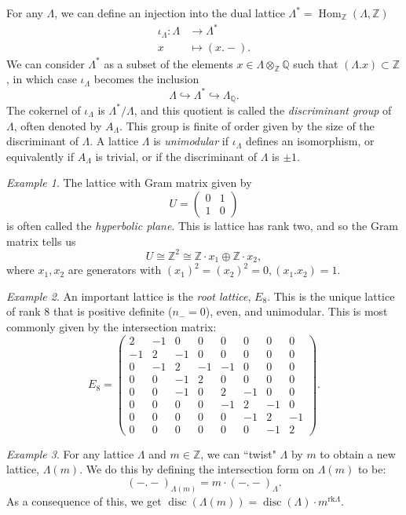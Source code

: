 \documentclass[12pt,twoside]{reedthesis}
\theoremstyle{plain}
\theoremstyle{definition}
\theoremstyle{remark}
\newtheorem{example}{Example}[section]
\newcommand{\ZZ}{\mathbb{Z}}
\newcommand{\QQ}{\mathbb{Q}}
\newcommand{\Hom}{\operatorname{Hom}}
\newcommand{\disc}{\operatorname{disc}}
\begin{document}
For any $\Lambda$, we can define an injection into the dual lattice $\Lambda^*=\Hom_\ZZ(\Lambda,\ZZ)$
\begin{align*}
\iota_\Lambda:\Lambda&\to\Lambda^*\\
x&\mapsto(x.-).
\end{align*}
We can consider $\Lambda^*$ as a subset of the elements $x\in\Lambda\otimes_\ZZ\QQ$ such that $(\Lambda.x)\subset\ZZ$, in which case $\iota_\Lambda$ becomes the inclusion \[\Lambda\hookrightarrow\Lambda^*\hookrightarrow\Lambda_\QQ.\] The cokernel of $\iota_\Lambda$ is $\Lambda^*/\Lambda$, and this quotient is called the \emph{discriminant group} of $\Lambda$, often denoted by $A_\Lambda$. This group is finite of order given by the size of the discriminant of $\Lambda$. A lattice $\Lambda$ is \emph{unimodular} if $\iota_\Lambda$ defines an isomorphism, or equivalently if $A_\Lambda$ is trivial, or if the discriminant of $\Lambda$ is $\pm1$.
\begin{example}
The lattice with Gram matrix given by
\[
U=\begin{pmatrix}
0 & 1\\
1 & 0
\end{pmatrix}
\] is often called the \emph{hyperbolic plane}. This is lattice has rank two, and so the Gram matrix tells us
\[
U\cong\ZZ^2\cong\ZZ\cdot x_1\oplus\ZZ\cdot x_2,
\]
where $x_1, x_2$ are generators with $(x_1)^2=(x_2)^2=0, (x_1.x_2)=1$.
\end{example}
\begin{example}
An important lattice is the \emph{root lattice}, $E_8$. This is the unique lattice of rank 8 that is positive definite ($n_-=0$), even, and unimodular. This is most commonly given by the intersection matrix:
\[
E_8=
\begin{pmatrix}
2 & -1 & 0 & 0 & 0 & 0 & 0 & 0\\
-1 & 2 & -1 & 0 & 0 & 0 & 0 & 0\\
0 & -1 & 2 & -1 & -1 & 0 & 0 & 0\\
0 & 0 & -1 & 2 & 0 & 0 & 0 & 0\\
0 & 0 & -1 & 0 & 2 & -1 & 0 & 0\\
0 & 0 & 0 & 0 & -1 & 2 & -1 & 0\\
0 & 0 & 0 & 0 & 0 & -1 & 2 & -1\\
0 & 0 & 0 & 0 & 0 & 0 & -1 & 2
\end{pmatrix}.
\]
\end{example}
\begin{example}
For any lattice $\Lambda$ and $m\in\ZZ$, we can ``twist" $\Lambda$ by $m$ to obtain a new lattice, $\Lambda(m)$. We do this by defining the intersection form on $\Lambda(m)$ to be:
\[
(-.-)_{\Lambda(m)}=m\cdot(-.-)_\Lambda.
\]
As a consequence of this, we get $\disc(\Lambda(m))=\disc(\Lambda)\cdot m^{\text{rk}\Lambda}$.
\end{example}
\end{document}
